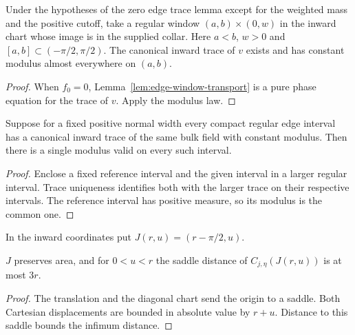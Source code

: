 \begin{lemma}
\label{lem:edge-window-modulus}
\leanok
Under the hypotheses of the zero edge trace lemma except for the weighted
mass and the positive cutoff, take a regular window $(a,b)\times(0,w)$
in the inward chart whose image is in the supplied collar. Here $a<b$,
$w>0$ and $[a,b]\subset(-\pi/2,\pi/2)$. The canonical inward trace of $v$
exists and has constant modulus almost everywhere on $(a,b)$.
\end{lemma}
\begin{proof}
\leanok
When $f_0=0$, Lemma~\ref{lem:edge-window-transport} is a pure phase
equation for the trace of $v$. Apply the modulus law.
\end{proof}

\begin{lemma}
\label{lem:common-edge-modulus}
\leanok
Suppose for a fixed positive normal width every compact regular edge interval
has a canonical inward trace of the same bulk field with constant modulus.
Then there is a single modulus valid on every such interval.
\end{lemma}
\begin{proof}
\leanok
Enclose a fixed reference interval and the given interval in a larger
regular interval. Trace uniqueness identifies both with the larger trace
on their respective intervals. The reference interval has positive measure,
so its modulus is the common one.
\end{proof}

\begin{definition}
\label{def:edge-corner-shift}
\leanok
In the inward coordinates put $J(r,u)=(r-\pi/2,u)$.
\end{definition}

\begin{lemma}
\label{lem:edge-corner-distance}
\leanok
$J$ preserves area, and for $0<u<r$ the saddle distance of
$C_{j,\eta}(J(r,u))$ is at most $3r$.
\end{lemma}
\begin{proof}
\leanok
The translation and the diagonal chart send the origin to a saddle.
Both Cartesian displacements are bounded in absolute value by $r+u$.
Distance to this saddle bounds the infimum distance.
\end{proof}

